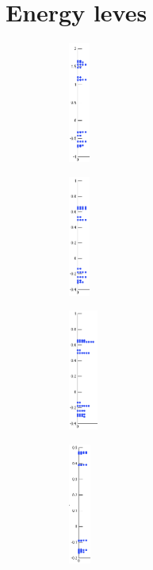 \section{Energy leves}
\begin{figure}
	\centering
	\begin{subfigure}{60px}
		\includegraphics[height=150px]{Fig/Plots/r1b.png}
		\caption{}
	\end{subfigure}    
	\begin{subfigure}{60px}
		\includegraphics[height=150px]{Fig/Plots/r3b.png}
		\caption{}
	\end{subfigure}
	\begin{subfigure}{60px}
		\includegraphics[height=150px]{Fig/Plots/r3a.png}
		\caption{}
	\end{subfigure}
	\begin{subfigure}{60px}
		\includegraphics[height=150px]{Fig/Plots/r5b.png}

\end{subfigure}
\end{figure}
